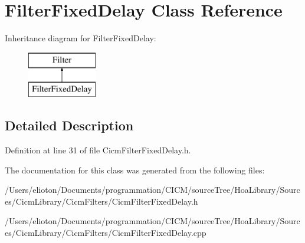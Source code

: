 \hypertarget{class_filter_fixed_delay}{\section{Filter\-Fixed\-Delay Class Reference}
\label{class_filter_fixed_delay}
}
Inheritance diagram for Filter\-Fixed\-Delay\-:\begin{figure}[H]
\begin{center}
\leavevmode
\includegraphics[height=2.000000cm]{class_filter_fixed_delay}
\end{center}
\end{figure}


\subsection{Detailed Description}


Definition at line 31 of file Cicm\-Filter\-Fixed\-Delay.\-h.



The documentation for this class was generated from the following files\-:\begin{DoxyCompactItemize}
\item 
/\-Users/elioton/\-Documents/programmation/\-C\-I\-C\-M/source\-Tree/\-Hoa\-Library/\-Sources/\-Cicm\-Library/\-Cicm\-Filters/Cicm\-Filter\-Fixed\-Delay.\-h\item 
/\-Users/elioton/\-Documents/programmation/\-C\-I\-C\-M/source\-Tree/\-Hoa\-Library/\-Sources/\-Cicm\-Library/\-Cicm\-Filters/Cicm\-Filter\-Fixed\-Delay.\-cpp\end{DoxyCompactItemize}
